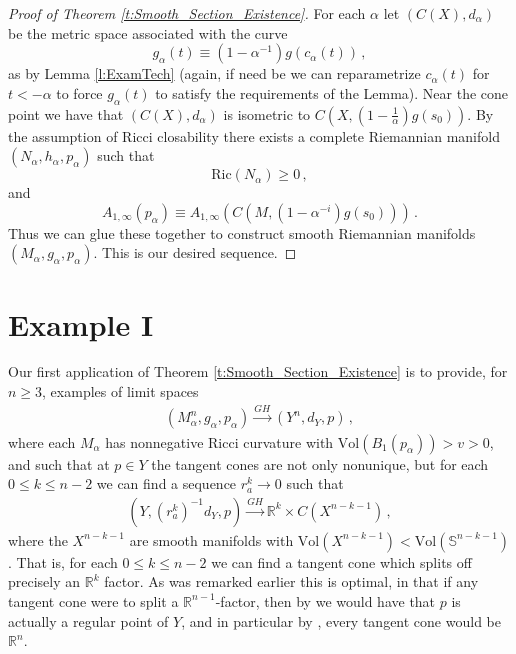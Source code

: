 \documentclass[11pt]{article}
\newcommand{\Ric}{\text{Ric}}
\newcommand{\Vol}{\text{Vol}}
\newcommand{\RR}{\mathds{R}}
\newcommand{\Sn}{\mathds{S}}
\begin{document}
\begin{proof}[Proof of Theorem \ref{t:Smooth_Section_Existence}]
For each $\alpha$ let $(C(X),d_\alpha)$ be the metric space associated with the curve
$$
g_\alpha(t)\equiv (1-\alpha^{-1})g(c_\alpha(t))\, ,
$$
as by Lemma \ref{l:ExamTech} (again, if need be we can reparametrize $c_\alpha(t)$ for $t<-\alpha$ to force $g_\alpha(t)$ to satisfy the requirements of the Lemma).  Near the cone point we have that $(C(X),d_\alpha)$ is isometric to $C(X,(1-\frac{1}{\alpha})g(s_0))$.  By the assumption of Ricci closability there exists a complete Riemannian manifold $(N_\alpha,h_\alpha,p_\alpha)$ such that
$$
\Ric(N_\alpha)\geq 0\, ,
$$
and
$$
A_{1,\infty}(p_\alpha)\equiv A_{1,\infty}(C(M,(1-\alpha^{-i})g(s_0)))\, .
$$
Thus we can glue these together to construct smooth Riemannian manifolds $(M_\alpha,g_\alpha,p_\alpha)$.  This is our desired sequence.
\end{proof}



\section{Example I}\label{ss:Example1}
Our first application of Theorem \ref{t:Smooth_Section_Existence} is to provide, for $n\geq 3$, examples of limit spaces
\begin{align}
 (M^n_\alpha,g_\alpha,p_\alpha)\stackrel{GH}{\rightarrow} (Y^n,d_Y,p)\, ,
\end{align}
where each $M_\alpha$ has nonnegative Ricci curvature with $\Vol(B_1(p_\alpha))>v>0$, and such that at $p\in Y$ the tangent cones are not only nonunique, but for each $0\leq k\leq n-2$ we can find a sequence $r^k_a\rightarrow 0$ such that
\begin{align}
(Y,(r^k_a)^{-1}d_Y,p)\stackrel{GH}{\rightarrow} \RR^k\times C(X^{n-k-1})\, ,
\end{align}
where the $X^{n-k-1}$ are smooth manifolds with $\Vol(X^{n-k-1})<\Vol(\Sn^{n-k-1})$.  That is, for each $0\leq k\leq n-2$ we can find a tangent cone which splits off precisely an $\RR^k$ factor.  As was remarked earlier this is optimal, in that if any tangent cone were to split a $\RR^{n-1}$-factor, then by \cite{ChC2} we would have that $p$ is actually a regular point of $Y$, and in particular by \cite{A},\cite{C} every tangent cone would be $\RR^n$.
\end{document}
